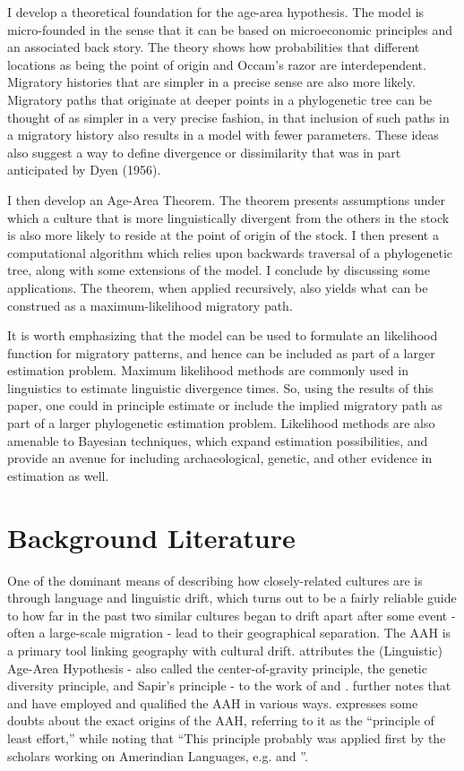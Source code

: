 \documentclass[11pt]{article}
\begin{document}
I develop a theoretical foundation for the age-area hypothesis. The model is micro-founded in the sense that it can be based on microeconomic principles and an associated back story. The theory shows how probabilities that different locations as being the point of origin and Occam's razor are interdependent. Migratory histories that are simpler in a precise sense are also more likely. Migratory paths that originate at deeper points in a phylogenetic tree can be thought of as simpler in a very precise fashion, in that inclusion of such paths in a migratory history also results in a model with fewer parameters. These ideas also suggest a way to define divergence or dissimilarity that was in part anticipated by Dyen (1956). 

I then develop an Age-Area Theorem. The theorem presents assumptions under which a culture that is more linguistically divergent from the others in the stock is also more likely to reside at the point of origin of the stock. I then present a computational algorithm which relies upon backwards traversal of a phylogenetic tree, along with some extensions of the model. I conclude by discussing some applications. The theorem, when applied recursively, also yields what can be construed as a maximum-likelihood migratory path. 

It is worth emphasizing that the model can be used to formulate an likelihood function for migratory patterns, and hence can be included as part of a larger estimation problem. Maximum likelihood methods are commonly used in linguistics to estimate linguistic divergence times. So, using the results of this paper, one could in principle estimate or include the implied migratory path as part of a larger phylogenetic estimation problem. Likelihood methods are also amenable to Bayesian techniques, which expand estimation possibilities, and provide an avenue for including archaeological, genetic, and other evidence in estimation as well. 

\section{Background Literature}

One of the dominant means of describing how closely-related cultures are is through language and linguistic drift, which turns out to be a fairly reliable guide to how far in the past two similar cultures began to drift apart after some event - often a large-scale migration - lead to their geographical separation. The AAH is a primary tool linking geography with cultural drift. \citet[p.12]{trask00} attributes the (Linguistic) Age-Area Hypothesis - also called the center-of-gravity principle, the genetic diversity principle, and Sapir's principle - to the work of \cite{latham51}  and \cite{sapir16}. \cite{trask00} further notes that \cite{mallory97} and \cite{nichols97} have employed and qualified the AAH in various ways.   \citet[p.336]{dimmendaal11} expresses some doubts about the exact origins of the AAH, referring to it as the ``principle of least effort,'' while noting that ``This principle probably was applied first by the scholars working on Amerindian Languages, e.g. \cite{sapir16} and \cite{dyen56}''.
\end{document}
